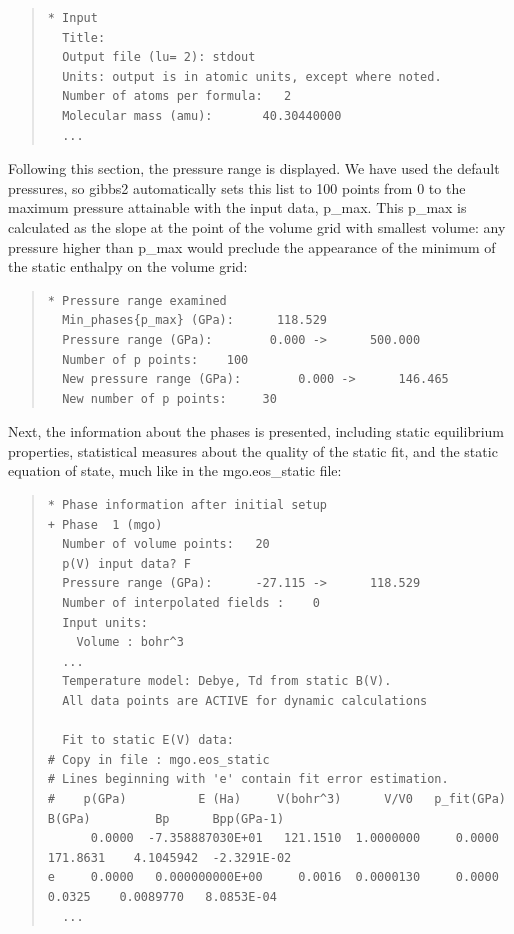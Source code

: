 \documentclass[a4paper]{article}
\begin{document}
\begin{quote}
\begin{verbatim}
* Input
  Title:
  Output file (lu= 2): stdout
  Units: output is in atomic units, except where noted.
  Number of atoms per formula:   2
  Molecular mass (amu):       40.30440000
  ...
\end{verbatim}
\end{quote}

Following this section, the pressure range is displayed. We have
used the default pressures, so gibbs2 automatically sets this list to
100 points from 0 to the maximum pressure attainable with the input
data, p\_max. This p\_max is calculated as the slope at the point of the
volume grid with smallest volume: any pressure higher than p\_max would
preclude the appearance of the minimum of the static enthalpy on the
volume grid:

\begin{quote}
\begin{verbatim}
* Pressure range examined
  Min_phases{p_max} (GPa):      118.529
  Pressure range (GPa):        0.000 ->      500.000
  Number of p points:    100
  New pressure range (GPa):        0.000 ->      146.465
  New number of p points:     30
\end{verbatim}
\end{quote}

Next, the information about the phases is presented, including static
equilibrium properties, statistical measures about the quality of the
static fit, and the static equation of state, much like in the
mgo.eos\_static file:

\begin{quote}
\begin{verbatim}
* Phase information after initial setup
+ Phase  1 (mgo)
  Number of volume points:   20
  p(V) input data? F
  Pressure range (GPa):      -27.115 ->      118.529
  Number of interpolated fields :    0
  Input units:
    Volume : bohr^3
  ...
  Temperature model: Debye, Td from static B(V).
  All data points are ACTIVE for dynamic calculations

  Fit to static E(V) data:
# Copy in file : mgo.eos_static
# Lines beginning with 'e' contain fit error estimation.
#    p(GPa)          E (Ha)     V(bohr^3)      V/V0   p_fit(GPa)   B(GPa)         Bp      Bpp(GPa-1)
      0.0000  -7.358887030E+01   121.1510  1.0000000     0.0000   171.8631    4.1045942  -2.3291E-02
e     0.0000   0.000000000E+00     0.0016  0.0000130     0.0000     0.0325    0.0089770   8.0853E-04
  ...
\end{verbatim}
\end{quote}
\end{document}
